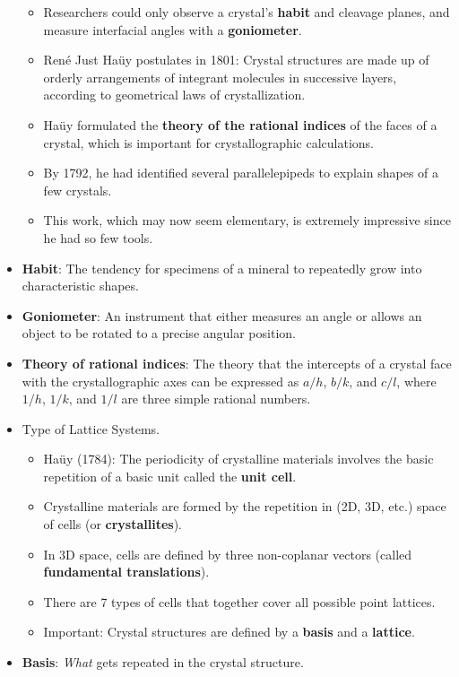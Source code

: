 \documentclass[../notes.tex]{subfiles}
\begin{document}
\begin{itemize}
\begin{itemize}
        \item Researchers could only observe a crystal's \textbf{habit} and cleavage planes, and measure interfacial angles with a \textbf{goniometer}.
        \item Ren\'{e} Just Ha\"{u}y postulates in 1801: Crystal structures are made up of orderly arrangements of integrant molecules in successive layers, according to geometrical laws of crystallization.
        \item Ha\"{u}y formulated the \textbf{theory of the rational indices} of the faces of a crystal, which is important for crystallographic calculations.
        \item By 1792, he had identified several parallelepipeds to explain shapes of a few crystals.
        \item This work, which may now seem elementary, is extremely impressive since he had so few tools.
    \end{itemize}
    \item \textbf{Habit}: The tendency for specimens of a mineral to repeatedly grow into characteristic shapes.
    \item \textbf{Goniometer}: An instrument that either measures an angle or allows an object to be rotated to a precise angular position.
    \item \textbf{Theory of rational indices}: The theory that the intercepts of a crystal face with the crystallographic axes can be expressed as $a/h$, $b/k$, and $c/l$, where $1/h$, $1/k$, and $1/l$ are three simple rational numbers.
    \item Type of Lattice Systems.
    \begin{itemize}
        \item Ha\"{u}y (1784): The periodicity of crystalline materials involves the basic repetition of a basic unit called the \textbf{unit cell}.
        \item Crystalline materials are formed by the repetition in (2D, 3D, etc.) space of cells (or \textbf{crystallites}).
        \item In 3D space, cells are defined by three non-coplanar vectors (called \textbf{fundamental translations}).
        \item There are 7 types of cells that together cover all possible point lattices.
        \item Important: Crystal structures are defined by a \textbf{basis} and a \textbf{lattice}.
    \end{itemize}
    \item \textbf{Basis}: \emph{What} gets repeated in the crystal structure.

\end{itemize}
\end{document}
